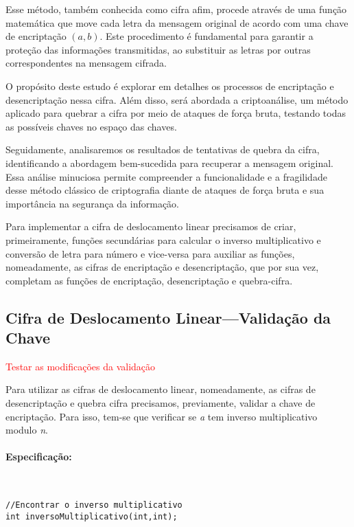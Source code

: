 Esse método, também conhecida como cifra afim, procede através de uma função matemática que move cada letra da mensagem original de acordo com uma chave de encriptação $(a,b)$. Este procedimento é fundamental para garantir a proteção das informações transmitidas, ao substituir as letras por outras correspondentes na mensagem cifrada.

O propósito deste estudo é explorar em detalhes os processos de encriptação e desencriptação nessa cifra. Além disso, será abordada a criptoanálise, um método aplicado para quebrar a cifra por meio de ataques de força bruta, testando todas as possíveis chaves no espaço das chaves.

Seguidamente, analisaremos os resultados de tentativas de quebra da cifra, identificando a abordagem bem-sucedida para recuperar a mensagem original. Essa análise minuciosa permite compreender a funcionalidade e a fragilidade desse método clássico de criptografia diante de ataques de força bruta e sua importância na segurança da informação.

Para implementar a cifra de deslocamento linear precisamos de criar, primeiramente, funções secundárias para calcular o inverso multiplicativo e conversão de letra para número e vice-versa para auxiliar as funções, nomeadamente, as cifras de encriptação e desencriptação, que por sua vez, completam as funções de encriptação, desencriptação e quebra-cifra.

\subsection{Cifra de Deslocamento Linear---Validação da Chave}
\label{sec:cdlValidacaoChave}
\textcolor{red}{Testar as modificações da validação}

Para utilizar as cifras de deslocamento linear, nomeadamente, as cifras de desencriptação e quebra cifra precisamos, previamente, validar a chave de encriptação. Para isso, tem-se que verificar se \emph{a} tem inverso multiplicativo modulo \emph{n}. 

\paragraph{Especificação:} {\ }

\begin{lstlisting}[frame=single,mathescape=true,caption={Cifra de Deslocamento Simples---Especificação de \texttt{cifraDesencriptar}},captionpos=b,label={lst:DeslocamentoSimplesDesencriptar},basicstyle=\footnotesize]
//Encontrar o inverso multiplicativo
int inversoMultiplicativo(int,int);
\end{lstlisting}

